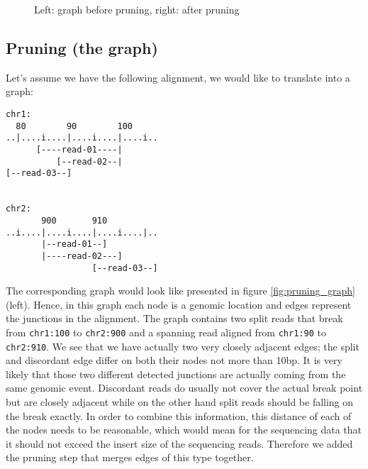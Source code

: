 \documentclass{article}
\theoremstyle{definition}
\begin{document}
\begin{figure}
\caption{Left: graph before pruning, right: after pruning}
\label{fig:edges_clips}
\end{figure}

\subsection{Pruning (the graph)}
Let's assume we have the following alignment, we would like to translate into a graph:
\begin{verbatim}
chr1:
  80        90        100
..|....i....|....i....|....i..
      [----read-01----|
          [--read-02--|
[--read-03--]


chr2:      
       900       910
..i....|....i....|....i....|..
       |--read-01--]
       |----read-02---]
                 [--read-03--]
\end{verbatim}
The corresponding graph would look like presented in figure \ref{fig:pruning_graph} (left).
Hence, in this graph each node is a genomic location and edges represent the junctions in the alignment.
The graph contains two split reads that break from \verb|chr1:100| to \verb|chr2:900| and a spanning read aligned from \verb|chr1:90| to \verb|chr2:910|.
We see that we have actually two very closely adjacent edges; the split and discordant edge differ on both their nodes not more than 10bp.
It is very likely that those two different detected junctions are actually coming from the same genomic event.
Discordant reads do usually not cover the actual break point but are closely adjacent while on the other hand split reads should be falling on the break exactly.
In order to combine this information, this distance of each of the nodes needs to be reasonable, which would mean for the sequencing data that it should not exceed the insert size of the sequencing reads.
Therefore we added the pruning step that merges edges of this type together.
\end{document}
